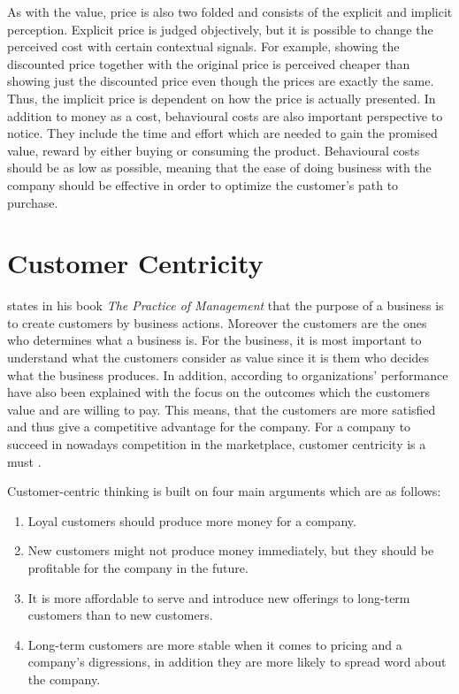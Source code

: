 As with the value, price is also two folded and consists of the explicit and implicit perception. Explicit price is judged objectively, but it is possible to change the perceived cost with certain contextual signals. For example, showing the discounted price together with the original price is perceived cheaper than showing just the discounted price even though the prices are exactly the same. Thus, the implicit price is dependent on how the price is actually presented. In addition to money as a cost, behavioural costs are also important perspective to notice. They include the time and effort which are needed to gain the promised value, reward by either buying or consuming the product. Behavioural costs should be as low as possible, meaning that the ease of doing business with the company should be effective in order to optimize the customer's path to purchase. \parencite{Decoded:2013}  



\section{Customer Centricity}

\textcite{Drucker:2007} states in his book \emph{The Practice of Management} that the purpose of a business is to create customers by business actions. Moreover the customers are the ones who determines what a business is. For the business, it is most important to understand what the customers consider as value since it is them who decides what the business produces. In addition, according to \textcite{Parniangtong:2017} organizations' performance have also been explained with the focus on the outcomes which the customers value and are willing to pay. This means, that the customers are more satisfied and thus give a competitive advantage for the company. For a company to succeed in nowadays competition in the marketplace, customer centricity is a must \parencite{PathToCustomerCentricity:2006}.

Customer-centric thinking is built on four main arguments which are as follows:
\begin{enumerate}
\item Loyal customers should produce more money for a company.
\item New customers might not produce money immediately, but they should be profitable for the company in the future.
\item  It is more affordable to serve and introduce new offerings to long-term customers than to new customers.
\item  Long-term customers are more stable when it comes to pricing and a company's digressions, in addition they are more likely to spread word about the company. \parencite{Parniangtong:2017}
\end{enumerate}

